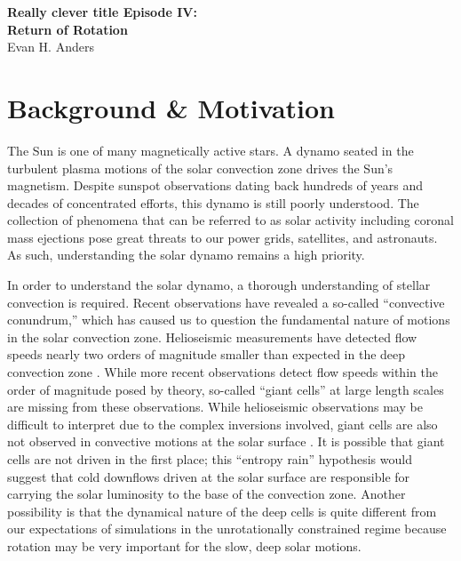 \documentclass[aasms,12pt]{article}
\begin{document}
\begin{center}
   \large\textbf{Really clever title Episode IV:}\\
   \large\textbf{Return of Rotation}\\
   \vspace{0.2cm}
   \large{Evan H. Anders}\\
   \vspace{0.2cm}
\end{center}

\vspace{-0.6cm}

\section{Background \& Motivation}
The Sun is one of many magnetically active stars.
A dynamo seated in the turbulent plasma motions of the solar convection zone drives the Sun's magnetism.
Despite sunspot observations dating back hundreds of years and decades of concentrated efforts, this dynamo is still poorly understood.
The collection of phenomena that can be referred to as solar activity including coronal mass ejections pose great threats to our power grids, satellites, and astronauts.
As such, understanding the solar dynamo remains a high priority.

In order to understand the solar dynamo, a thorough understanding of stellar convection is required.
Recent observations have revealed a so-called ``convective conundrum,'' which has caused us to question the fundamental nature of motions in the solar convection zone.
Helioseismic measurements have detected flow speeds nearly two orders of magnitude smaller than expected in the deep convection zone \citep{hanasoge&all2012}.
While more recent observations \citep{greer&all2015} detect flow speeds within the order of magnitude posed by theory, so-called ``giant cells'' at large length scales are missing from these observations.
While helioseismic observations may be difficult to interpret due to the complex inversions involved, giant cells are also not observed in convective motions at the solar surface \citep{hathaway&all2015}.
It is possible that giant cells are not driven in the first place; this ``entropy rain'' hypothesis would suggest that cold downflows driven at the solar surface are responsible for carrying the solar luminosity to the base of the convection zone.
Another possibility is that the dynamical nature of the deep cells is quite different from our expectations of simulations in the unrotationally constrained regime because rotation may be very important for the slow, deep solar motions.
\end{document}
